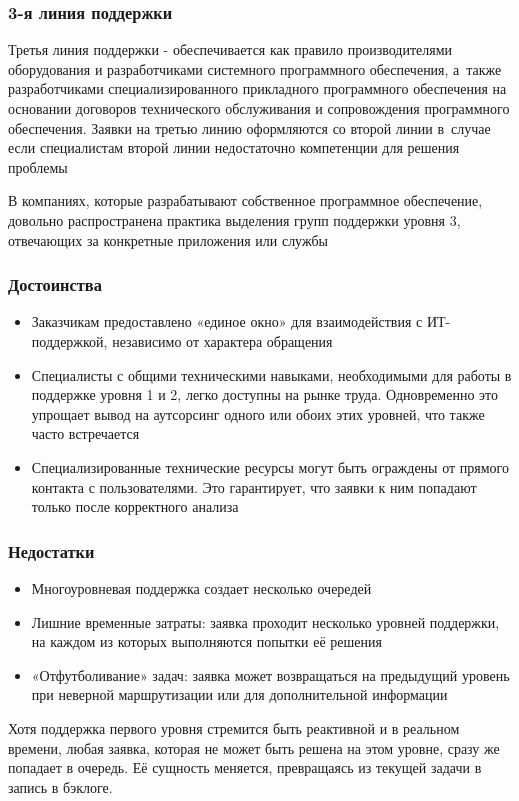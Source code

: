 \documentclass{../industrial-development}
\begin{document}
\begin{frame} \frametitle{3-я линия поддержки}

    Третья линия поддержки - обеспечивается как правило производителями оборудования и разработчиками системного программного обеспечения, а~также разработчиками специализированного прикладного программного обеспечения на основании договоров технического обслуживания и сопровождения программного обеспечения. Заявки на третью линию оформляются со второй линии в~случае если специалистам второй линии недостаточно компетенции для решения проблемы  

\end{frame}
\lecturenotes
В компаниях, которые разрабатывают собственное программное обеспечение, довольно распространена практика выделения групп поддержки уровня 3, отвечающих за конкретные приложения или службы

\begin{frame} \frametitle{Достоинства}
	\begin{itemize} 
		\item Заказчикам предоставлено «единое окно» для взаимодействия с ИТ-поддержкой, независимо от характера обращения
		\item Специалисты с общими техническими навыками, необходимыми для работы в поддержке уровня 1 и 2, легко доступны на рынке труда. Одновременно это упрощает вывод на аутсорсинг одного или обоих этих уровней, что также часто встречается
		\item Специализированные технические ресурсы могут быть ограждены от прямого контакта с пользователями. Это гарантирует, что заявки к ним попадают только после корректного анализа
	\end{itemize}
\end{frame}

\begin{frame} \frametitle{Недостатки}
	\begin{itemize} 
		\item Многоуровневая поддержка создает несколько очередей
		\item Лишние временные затраты: заявка проходит несколько уровней поддержки, на каждом из которых выполняются попытки её решения
		\item «Отфутболивание» задач: заявка может возвращаться на предыдущий уровень при неверной маршрутизации или для дополнительной информации
	\end{itemize}
\end{frame}

\lecturenotes Хотя поддержка первого уровня стремится быть реактивной и в реальном времени, любая заявка, которая не может быть решена на этом уровне, сразу же попадает в очередь. Её сущность меняется, превращаясь из текущей задачи в запись в бэклоге.
\end{document}
